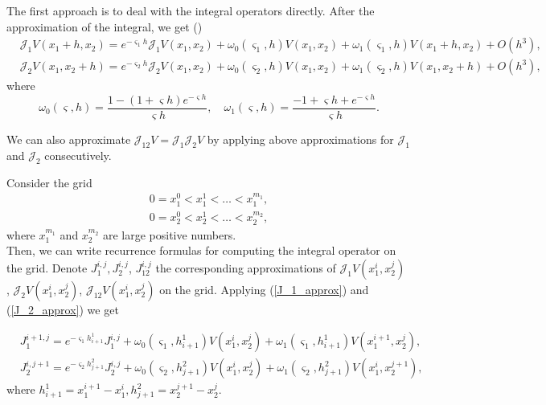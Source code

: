 The first approach is to deal with the integral operators directly. After the approximation of the integral, we get (\cite{LiptonSepp})
\begin{align}
	&\mathcal{J}_1 V(x_1 + h, x_2) = e^{-\varsigma_1 h} \mathcal{J}_1 V(x_1, x_2) +  \omega_0(\varsigma_1, h) V(x_1, x_2) + \omega_1(\varsigma_1, h) V(x_1 + h, x_2) + O(h^3), \label{J_1_approx}\\
	& \mathcal{J}_2 V(x_1, x_2 + h) = e^{-\varsigma_2 h} \mathcal{J}_2 V(x_1, x_2) +  \omega_0(\varsigma_2, h) V(x_1, x_2) + \omega_1(\varsigma_2, h) V(x_1, x_2 + h) + O(h^3) \label{J_2_approx},
\end{align}
where
\begin{equation*}
	\omega_0(\varsigma, h) = \frac{1 - (1 + \varsigma h) e^{-\varsigma h}}{\varsigma h}, \quad \omega_1(\varsigma, h) = \frac{-1 + \varsigma h + e^{-\varsigma h}}{\varsigma h}.
\end{equation*}

We can also approximate $\mathcal{J}_{12} V = \mathcal{J}_1 \mathcal{J}_2 V$ by applying above approximations for $\mathcal{J}_1$ and $\mathcal{J}_2$ consecutively.


Consider the grid
\begin{equation}
	\begin{aligned}
		0 = x_1^0 < x_1^1 < \ldots < x_1^{m_1}, \\
		0 = x_2^0 < x_2^1 < \ldots < x_2^{m_2},
	\end{aligned}
\end{equation}
where $x_1^{m_1}$ and $x_2^{m_2}$ are large positive numbers.\\

Then, we can write recurrence formulas for computing the integral operator on the grid. Denote $J_1^{i, j}, J_2^{i, j}$, $J_{12}^{i, j}$ the corresponding approximations of $\mathcal{J}_{1}V(x_1^i, x_2^j)$ , $ \mathcal{J}_{2}V(x_1^i, x_2^j)$, $\mathcal{J}_{12}V(x_1^i, x_2^j)$ on the grid. Applying (\ref{J_1_approx}) and (\ref{J_2_approx}) we get

\begin{align}
	&J_1^{i+1, j} = e^{-\varsigma_1 h^1_{i+1}} J_1^{i, j} + \omega_0(\varsigma_1, h^1_{i+1}) V(x_1^i, x_2^j) + \omega_1(\varsigma_1, h_{i+1}^1) V(x_1^{i+1}, x_2^{j}), \label{J_1_rec}\\
	&J_2^{i, j+1} = e^{-\varsigma_2 h^2_{j+1}} J_2^{i, j} + \omega_0(\varsigma_2, h^2_{j+1}) V(x_1^i, x_2^j) + \omega_1(\varsigma_2, h_{j+1}^2) V(x_1^{i}, x_2^{j+1}), \label{J_2_rec}
\end{align}
where $h_{i+1}^1 = x_1^{i+1} - x_1^{i}, h_{j+1}^2 = x_2^{j+1} - x_2^{j}$.

